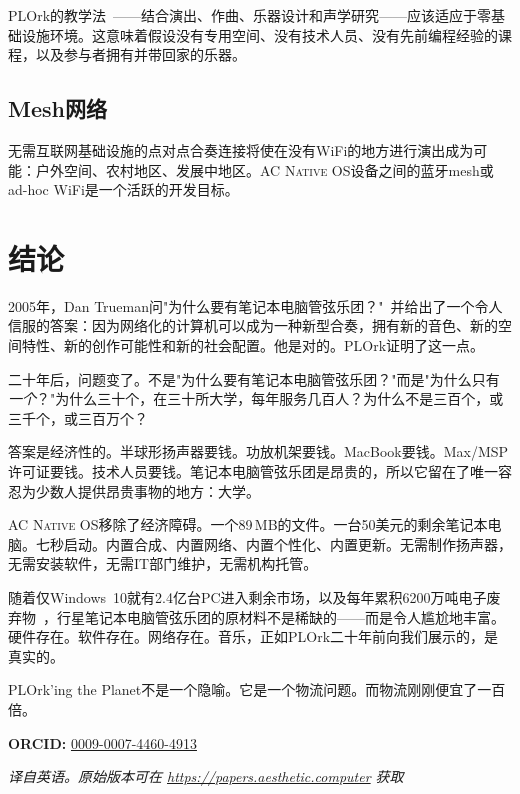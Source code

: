 \documentclass[10pt,letterpaper,twocolumn]{article}
\newcommand{\acos}{\textsc{AC Native OS}}
\begin{document}
PLOrk的教学法~\citep{trueman2007why}——结合演出、作曲、乐器设计和声学研究——应该适应于零基础设施环境。这意味着假设没有专用空间、没有技术人员、没有先前编程经验的课程，以及参与者拥有并带回家的乐器。

\subsection{Mesh网络}

无需互联网基础设施的点对点合奏连接将使在没有WiFi的地方进行演出成为可能：户外空间、农村地区、发展中地区。\acos{}设备之间的蓝牙mesh或ad-hoc WiFi是一个活跃的开发目标。


\section{结论}

2005年，Dan Trueman问"为什么要有笔记本电脑管弦乐团？"~\citep{trueman2007why}并给出了一个令人信服的答案：因为网络化的计算机可以成为一种新型合奏，拥有新的音色、新的空间特性、新的创作可能性和新的社会配置。他是对的。PLOrk证明了这一点。

二十年后，问题变了。不是"为什么要有笔记本电脑管弦乐团？"而是"为什么只有\emph{一个}？"为什么三十个，在三十所大学，每年服务几百人？为什么不是三百个，或三千个，或三百万个？

答案是经济性的。半球形扬声器要钱。功放机架要钱。MacBook要钱。Max/MSP许可证要钱。技术人员要钱。笔记本电脑管弦乐团是昂贵的，所以它留在了唯一容忍为少数人提供昂贵事物的地方：大学。

\acos{}移除了经济障碍。一个89\,MB的文件。一台50美元的剩余笔记本电脑。七秒启动。内置合成、内置网络、内置个性化、内置更新。无需制作扬声器，无需安装软件，无需IT部门维护，无需机构托管。

随着仅Windows~10就有2.4亿台PC进入剩余市场，以及每年累积6200万吨电子废弃物~\citep{forti2024ewaste}，行星笔记本电脑管弦乐团的原材料不是稀缺的——而是令人尴尬地丰富。硬件存在。软件存在。网络存在。音乐，正如PLOrk二十年前向我们展示的，是真实的。

PLOrk'ing the Planet不是一个隐喻。它是一个物流问题。而物流刚刚便宜了一百倍。

\vspace{0.5em}
\noindent\textbf{ORCID:} \href{https://orcid.org/0009-0007-4460-4913}{0009-0007-4460-4913}

\vspace{0.5em}
\noindent\textit{译自英语。原始版本可在 \url{https://papers.aesthetic.computer} 获取}




\end{document}

